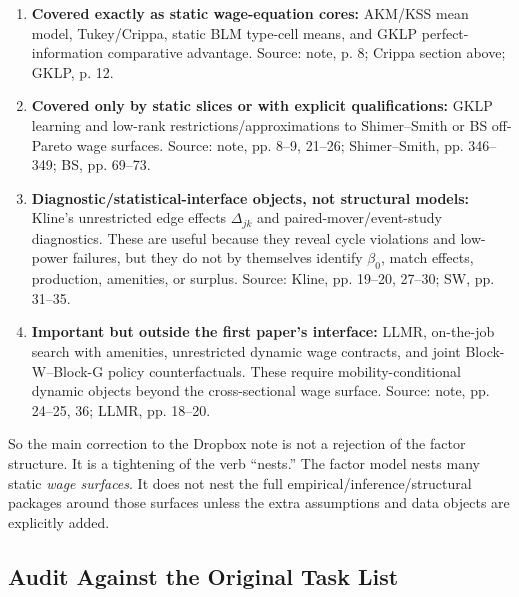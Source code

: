 \documentclass[11pt]{article}
\begin{document}
\begin{enumerate}
\item \textbf{Covered exactly as static wage-equation cores:} AKM/KSS mean model,
Tukey/Crippa, static BLM type-cell means, and GKLP perfect-information comparative
advantage. Source: note, p. 8; Crippa section above; GKLP, p. 12.

\item \textbf{Covered only by static slices or with explicit qualifications:} GKLP learning
and low-rank restrictions/approximations to Shimer--Smith or BS off-Pareto wage
surfaces. Source: note, pp. 8--9, 21--26; Shimer--Smith, pp. 346--349; BS, pp. 69--73.

\item \textbf{Diagnostic/statistical-interface objects, not structural models:} Kline's
unrestricted edge effects $\Delta_{jk}$ and paired-mover/event-study diagnostics. These
are useful because they reveal cycle violations and low-power failures, but they do not
by themselves identify $\beta_0$, match effects, production, amenities, or surplus.
Source: Kline, pp. 19--20, 27--30; SW, pp. 31--35.

\item \textbf{Important but outside the first paper's interface:} LLMR, on-the-job search
with amenities, unrestricted dynamic wage contracts, and joint Block-W--Block-G policy
counterfactuals. These require mobility-conditional dynamic objects beyond the
cross-sectional wage surface. Source: note, pp. 24--25, 36; LLMR, pp. 18--20.
\end{enumerate}

So the main correction to the Dropbox note is not a rejection of the factor structure. It
is a tightening of the verb ``nests.'' The factor model nests many static \emph{wage
surfaces}. It does not nest the full empirical/inference/structural packages around those
surfaces unless the extra assumptions and data objects are explicitly added.

\subsection{Audit Against the Original Task List}
\end{document}
